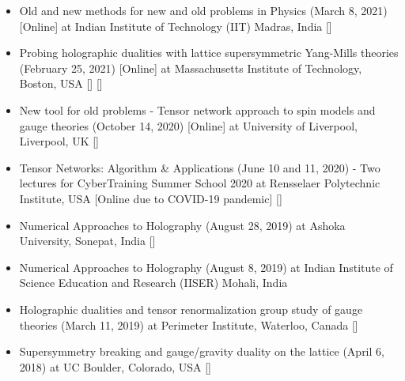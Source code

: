 \begin{itemize}
 \item Old and new methods for new and old problems in Physics
 (March 8, 2021) [Online] at Indian Institute of Technology (IIT) Madras, India
  [] 
\vspace{1mm} 
 
 \item Probing holographic dualities with lattice supersymmetric Yang-Mills theories 
 (February 25, 2021) [Online] at Massachusetts Institute of Technology, Boston, USA 
   []  [] 
 \vspace{1mm} 
 
 \item New tool for old problems - Tensor network approach to spin models and gauge theories 
 (October 14, 2020) [Online] at University of Liverpool, Liverpool, UK
  [] 
 \vspace{1mm} 
  
 \item Tensor Networks: Algorithm \& Applications (June 10 and 11, 2020) - Two lectures for 
 CyberTraining Summer School 2020 at Rensselaer Polytechnic Institute, USA [Online due to COVID-19 pandemic]  
   []  
\vspace{1mm} 

 \item Numerical Approaches to Holography (August 28, 2019) at Ashoka University, Sonepat, India [] 
\vspace{1mm} 
 
 \item Numerical Approaches to Holography (August 8, 2019) at Indian Institute of Science Education and Research (IISER) Mohali, India \vspace{1mm} 
 
  \item Holographic dualities and tensor renormalization group study of gauge theories (March 11, 2019) at Perimeter Institute, Waterloo, Canada 
 [] 
\vspace{1mm} 


  \item Supersymmetry breaking and gauge/gravity duality on the lattice (April 6, 2018) at UC Boulder, Colorado, USA 
    [] 
  \vspace{1mm} 
  

\end{itemize}
